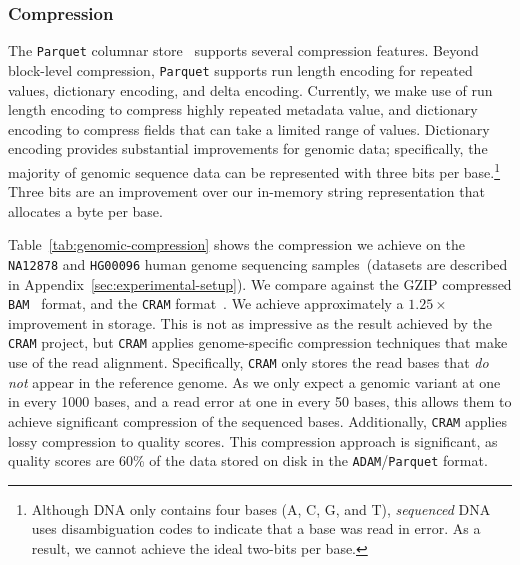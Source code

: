 \documentclass{sig-alternate}
\begin{document}
\subsubsection{Compression}
\label{sec:compression}

The \texttt{Parquet} columnar store~\cite{parquet} supports several compression features. Beyond block-level
compression, \texttt{Parquet} supports run length encoding for repeated values, dictionary encoding, and delta
encoding. Currently, we make use of run length encoding to compress highly repeated metadata value,
and dictionary encoding to compress fields that can take a limited range of values. Dictionary encoding provides
substantial improvements for genomic data; specifically, the majority of genomic sequence data can be
represented with three bits per base.\footnote{Although DNA only contains four bases (A, C, G, and T),
\emph{sequenced} DNA uses disambiguation codes to indicate that a base was read in error. As a result, we
cannot achieve the ideal two-bits per base.} Three bits are an improvement over our in-memory string representation
that allocates a byte per base.

Table~\ref{tab:genomic-compression} shows the compression we achieve on the \texttt{NA12878}
and \texttt{HG00096} human genome sequencing samples~(datasets are described in
Appendix~\ref{sec:experimental-setup}). We compare against the GZIP compressed \texttt{BAM}~\cite{li09} format, and
the \texttt{CRAM} format~\cite{fritz11}. We achieve approximately a $1.25\times$ improvement in storage. This is not as
impressive as the result achieved by the \texttt{CRAM} project, but \texttt{CRAM} applies genome-specific compression
techniques that make use of the read alignment. Specifically, \texttt{CRAM} only stores the read bases that \emph{do
not} appear in the reference genome. As we only expect a genomic variant at one in every 1000 bases, and a read error 
at one in every 50 bases, this allows them to achieve significant compression of the sequenced bases. Additionally,
\texttt{CRAM} applies lossy compression to quality scores. This compression approach is significant, as quality scores
are 60\% of the data stored on disk in the \texttt{ADAM}/\texttt{Parquet} format.
\end{document}

